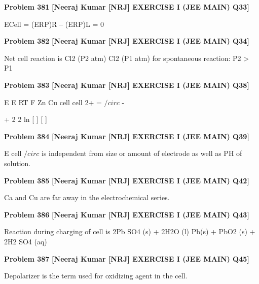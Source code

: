 \begin{problembox}
\textbf{Problem 381} \hfill \textbf{[Neeraj Kumar [NRJ] EXERCISE I (JEE MAIN) Q33]}
\label{q:ext-nrj_all_questions-381}

ECell = (ERP)R -- (ERP)L = 0
\end{problembox}

\begin{problembox}
\textbf{Problem 382} \hfill \textbf{[Neeraj Kumar [NRJ] EXERCISE I (JEE MAIN) Q34]}
\label{q:ext-nrj_all_questions-382}

Net cell reaction is Cl2 (P2 atm) 
 Cl2 (P1 
atm) for spontaneous reaction: P2 > P1
\end{problembox}

\begin{problembox}
\textbf{Problem 383} \hfill \textbf{[Neeraj Kumar [NRJ] EXERCISE I (JEE MAIN) Q38]}
\label{q:ext-nrj_all_questions-383}

E
E
RT
F
Zn
Cu
cell
cell
2+
=
$/circ$
-
 
+
2
2
ln [
]
[
]
\end{problembox}

\begin{problembox}
\textbf{Problem 384} \hfill \textbf{[Neeraj Kumar [NRJ] EXERCISE I (JEE MAIN) Q39]}
\label{q:ext-nrj_all_questions-384}

E cell
$/circ$
 is independent from size or amount of 
electrode as well as PH of solution.
\end{problembox}

\begin{problembox}
\textbf{Problem 385} \hfill \textbf{[Neeraj Kumar [NRJ] EXERCISE I (JEE MAIN) Q42]}
\label{q:ext-nrj_all_questions-385}

Ca and Cu are far away in the electrochemical 
series.
\end{problembox}

\begin{problembox}
\textbf{Problem 386} \hfill \textbf{[Neeraj Kumar [NRJ] EXERCISE I (JEE MAIN) Q43]}
\label{q:ext-nrj_all_questions-386}

Reaction during charging of cell is 2Pb SO4 (s) + 
2H2O (l) 
 Pb(s) + PbO2 (s) + 2H2 SO4 (aq)
\end{problembox}

\begin{problembox}
\textbf{Problem 387} \hfill \textbf{[Neeraj Kumar [NRJ] EXERCISE I (JEE MAIN) Q45]}
\label{q:ext-nrj_all_questions-387}

Depolarizer is the term used for oxidizing agent in 
the cell.
\end{problembox}


